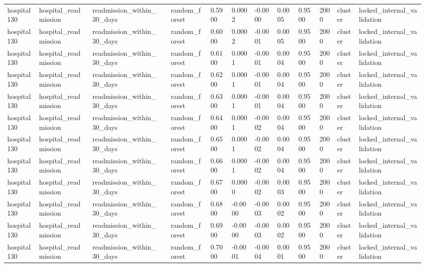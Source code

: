 \begin{tabular}{lllllllllllll}
hospital130 & hospital\_readmission & readmission\_within\_30\_days &  & random\_forest & 0.5900 & 0.0002 & -0.0000 & 0.0005 & 0.9500 & 2000 & cluster & locked\_internal\_validation \\
hospital130 & hospital\_readmission & readmission\_within\_30\_days &  & random\_forest & 0.6000 & 0.0002 & -0.0001 & 0.0005 & 0.9500 & 2000 & cluster & locked\_internal\_validation \\
hospital130 & hospital\_readmission & readmission\_within\_30\_days &  & random\_forest & 0.6100 & 0.0001 & -0.0001 & 0.0004 & 0.9500 & 2000 & cluster & locked\_internal\_validation \\
hospital130 & hospital\_readmission & readmission\_within\_30\_days &  & random\_forest & 0.6200 & 0.0001 & -0.0001 & 0.0004 & 0.9500 & 2000 & cluster & locked\_internal\_validation \\
hospital130 & hospital\_readmission & readmission\_within\_30\_days &  & random\_forest & 0.6300 & 0.0001 & -0.0001 & 0.0004 & 0.9500 & 2000 & cluster & locked\_internal\_validation \\
hospital130 & hospital\_readmission & readmission\_within\_30\_days &  & random\_forest & 0.6400 & 0.0001 & -0.0002 & 0.0004 & 0.9500 & 2000 & cluster & locked\_internal\_validation \\
hospital130 & hospital\_readmission & readmission\_within\_30\_days &  & random\_forest & 0.6500 & 0.0001 & -0.0002 & 0.0004 & 0.9500 & 2000 & cluster & locked\_internal\_validation \\
hospital130 & hospital\_readmission & readmission\_within\_30\_days &  & random\_forest & 0.6600 & 0.0001 & -0.0002 & 0.0004 & 0.9500 & 2000 & cluster & locked\_internal\_validation \\
hospital130 & hospital\_readmission & readmission\_within\_30\_days &  & random\_forest & 0.6700 & 0.0000 & -0.0002 & 0.0003 & 0.9500 & 2000 & cluster & locked\_internal\_validation \\
hospital130 & hospital\_readmission & readmission\_within\_30\_days &  & random\_forest & 0.6800 & -0.0000 & -0.0003 & 0.0002 & 0.9500 & 2000 & cluster & locked\_internal\_validation \\
hospital130 & hospital\_readmission & readmission\_within\_30\_days &  & random\_forest & 0.6900 & -0.0000 & -0.0003 & 0.0002 & 0.9500 & 2000 & cluster & locked\_internal\_validation \\
hospital130 & hospital\_readmission & readmission\_within\_30\_days &  & random\_forest & 0.7000 & -0.0001 & -0.0004 & 0.0001 & 0.9500 & 2000 & cluster & locked\_internal\_validation \\

\end{tabular}
